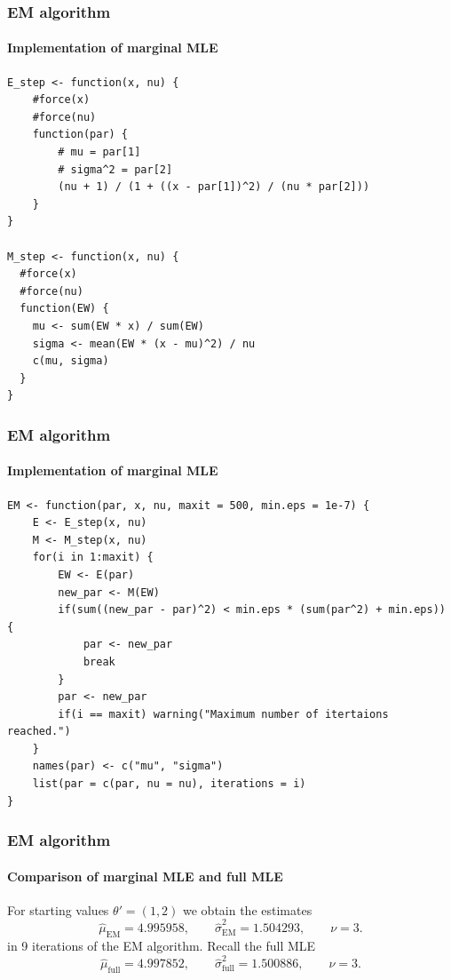 \documentclass[aspectratio=169]{beamer}
\begin{document}
\begin{frame}[fragile]
    \frametitle{EM algorithm}
    \framesubtitle{Implementation of marginal MLE}

\begin{verbatim}
E_step <- function(x, nu) {
    #force(x)
    #force(nu)
    function(par) {
        # mu = par[1]
        # sigma^2 = par[2]
        (nu + 1) / (1 + ((x - par[1])^2) / (nu * par[2]))
    }
}

M_step <- function(x, nu) {
  #force(x)
  #force(nu)
  function(EW) {
    mu <- sum(EW * x) / sum(EW)
    sigma <- mean(EW * (x - mu)^2) / nu
    c(mu, sigma)
  }
}
\end{verbatim}

\end{frame}
\begin{frame}[fragile]
    \frametitle{EM algorithm}
    \framesubtitle{Implementation of marginal MLE}

\begin{verbatim}
EM <- function(par, x, nu, maxit = 500, min.eps = 1e-7) {
    E <- E_step(x, nu)
    M <- M_step(x, nu)
    for(i in 1:maxit) {
        EW <- E(par)
        new_par <- M(EW)
        if(sum((new_par - par)^2) < min.eps * (sum(par^2) + min.eps)) {
            par <- new_par
            break
        }
        par <- new_par
        if(i == maxit) warning("Maximum number of itertaions reached.")
    }
    names(par) <- c("mu", "sigma")
    list(par = c(par, nu = nu), iterations = i)
}
\end{verbatim}

\end{frame}

\begin{frame}
    \frametitle{EM algorithm}
    \framesubtitle{Comparison of marginal MLE and full MLE}
    For starting values $\theta' = (1, 2)$ we obtain the estimates
    \begin{equation}
        \hat\mu_{\text{EM}}=4.995958,\quad\quad \hat\sigma^{2}_{\text{EM}}=1.504293,\quad\quad \nu = 3.
    \end{equation}
    in 9 iterations of the EM algorithm. Recall the full MLE
    \begin{equation}
        \hat\mu_{\text{full}} = 4.997852, \quad\quad \hat\sigma^{2}_{\text{full}}=1.500886,\quad\quad \nu = 3.
    \end{equation}
\end{frame}
\end{document}
